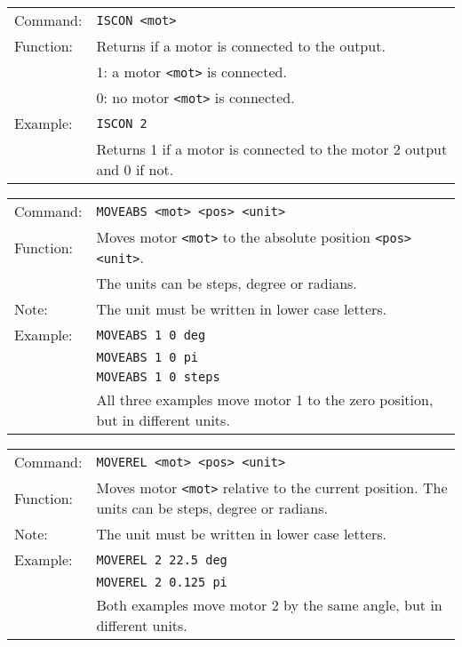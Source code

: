 \vspace{\vdistace}

\begin{table}[!htbp]
  \begin{tabularx}{\textwidth}{lX}
    Command:  & \texttt{ISCON <mot>}\\
    Function: & Returns if a motor is connected to the output.\\
              & 1: a motor \texttt{<mot>} is connected.\\
		      & 0: no motor \texttt{<mot>} is connected.\\
    Example:  & \texttt{ISCON 2}\\
              & Returns 1 if a motor is connected to the motor 2 output and 0 if not.
  \end{tabularx}
\end{table}

\vspace{\vdistace}

\begin{table}[!htbp]
  \begin{tabularx}{\textwidth}{lX}
    Command:  & \texttt{MOVEABS <mot> <pos> <unit>}\\
    Function: & Moves motor \texttt{<mot>} to the absolute position \texttt{<pos> <unit>}.\\
              & The units can be steps, degree or radians.\\
    Note:     & The unit must be written in lower case letters.\\
    Example:  & \texttt{MOVEABS 1 0 deg} \\
              & \texttt{MOVEABS 1 0 pi} \\
              & \texttt{MOVEABS 1 0 steps} \\
              & All three examples move motor 1 to the zero position, but in different units.
  \end{tabularx}
\end{table}

\vspace{\vdistace}

\begin{table}[!htbp]
  \begin{tabularx}{\textwidth}{lX}
    Command:  & \texttt{MOVEREL <mot> <pos> <unit>}\\
    Function: & Moves motor \texttt{<mot>} relative to the current position. The units can be steps, degree or radians.\\
    Note:     & The unit must be written in lower case letters.\\
    Example:  & \texttt{MOVEREL 2 22.5 deg} \\
              & \texttt{MOVEREL 2 0.125 pi} \\
              & Both examples move motor 2 by the same angle, but in different units.
  \end{tabularx}
\end{table}

